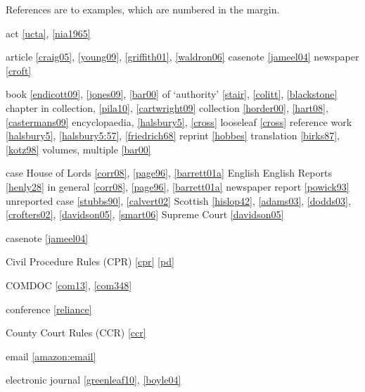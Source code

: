 \documentclass[a4paper,
               11pt,
	       DIV=1,			   
	       footinclude=false]
	      {scrartcl}
\begin{document}
\clearpage
{}
{\def\indexname{Table of Examples}

\begin{theindex}

References are to examples, which are numbered in the margin.
\bigskip
\item act \ref{ucta}, \ref{nia1965}
\item article \ref{craig05}, \ref{young09}, \ref{griffith01}, \ref{waldron06}
\subitem casenote \ref{jameel04}
\subitem newspaper \ref{croft}
\item book \ref{endicott09}, \ref{jones09}, \ref{bar00}
  \subitem of `authority' \ref{stair}, \ref{colitt}, \ref{blackstone}
  \subitem chapter in collection, \ref{pila10}, \ref{cartwright09}
  \subitem collection \ref{horder00}, \ref{hart08}, \ref{castermans09}
  \subitem encyclopaedia, \ref{halsbury5}, \ref{cross}
  \subitem looseleaf \ref{cross}
  \subitem reference work \ref{halsbury5}, \ref{halsbury5:57}, \ref{friedrich68}
  \subitem reprint \ref{hobbes}
  \subitem translation \ref{birks87}, \ref{kotz98}
  \subitem volumes, multiple \ref{bar00}

\item case
 \subitem House of Lords \ref{corr08}, \ref{page96}, \ref{barrett01a}
 \subitem English
   \subsubitem English Reports \ref{henly28}
   \subsubitem in general \ref{corr08}, \ref{page96}, \ref{barrett01a}
   \subsubitem newspaper report \ref{powick93}
   \subsubitem unreported case \ref{stubbs90}, \ref{calvert02}
 \subitem Scottish \ref{hislop42}, \ref{adams03}, \ref{dodds03},
    \ref{crofters02}, \ref{davidson05}, \ref{smart06}
 \subitem Supreme Court \ref{davidson05}

\item{casenote} \ref{jameel04}

\item Civil Procedure Rules (CPR) \ref{cpr} \ref{pd}

\item COMDOC \ref{com13}, \ref{com348}

\item conference \ref{reliance}

\item County Court Rules (CCR) \ref{ccr}

\item email \ref{amazon:email}

\item electronic journal \ref{greenleaf10}, \ref{boyle04}


\end{theindex}}
\end{document}

